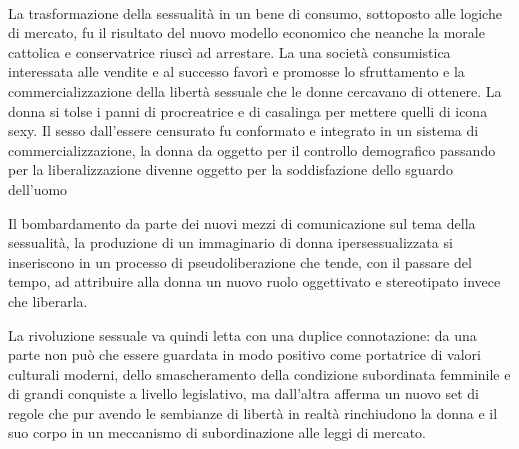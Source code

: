 \paragraph{}La trasformazione della sessualità in un bene di consumo, sottoposto alle logiche di mercato, fu il risultato del nuovo modello economico che neanche la morale cattolica e conservatrice riuscì ad arrestare.
La una società consumistica interessata alle vendite e al successo favorì e promosse lo sfruttamento e la commercializzazione della libertà sessuale che le donne cercavano di ottenere.
La donna si tolse i panni di procreatrice e di casalinga per mettere quelli di icona sexy.
Il sesso dall'essere censurato fu conformato e integrato in un sistema di commercializzazione, la donna da oggetto per il controllo demografico passando per la liberalizzazione divenne oggetto per la soddisfazione dello sguardo dell'uomo

Il bombardamento da parte dei nuovi mezzi di comunicazione sul tema della sessualità, la produzione di un immaginario di donna ipersessualizzata si inseriscono in un processo di pseudoliberazione che tende, con il passare del tempo, ad attribuire alla donna un nuovo ruolo oggettivato e stereotipato invece che liberarla.

La rivoluzione sessuale va quindi letta con una duplice connotazione: da una parte non può che essere guardata in modo positivo come portatrice di valori culturali moderni, dello smascheramento della condizione subordinata femminile e di grandi conquiste a livello legislativo, ma dall'altra afferma un nuovo set di regole che pur avendo le sembianze di libertà in realtà rinchiudono la donna e il suo corpo in un meccanismo di subordinazione alle leggi di mercato.
